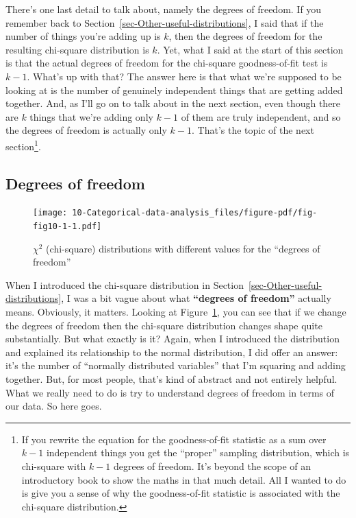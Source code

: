 \documentclass[
  a4paper,
]{book}
\begin{document}
There's one last detail to talk about, namely the degrees of freedom. If
you remember back to Section~\ref{sec-Other-useful-distributions}, I
said that if the number of things you're adding up is \(k\), then the
degrees of freedom for the resulting chi-square distribution is \(k\).
Yet, what I said at the start of this section is that the actual degrees
of freedom for the chi-square goodness-of-fit test is \(k - 1\). What's
up with that? The answer here is that what we're supposed to be looking
at is the number of genuinely independent things that are getting added
together. And, as I'll go on to talk about in the next section, even
though there are \(k\) things that we're adding only \(k - 1\) of them
are truly independent, and so the degrees of freedom is actually only
\(k - 1\). That's the topic of the next section\footnote{If you rewrite
  the equation for the goodness-of-fit statistic as a sum over \(k - 1\)
  independent things you get the ``proper'' sampling distribution, which
  is chi-square with \(k - 1\) degrees of freedom. It's beyond the scope
  of an introductory book to show the maths in that much detail. All I
  wanted to do is give you a sense of why the goodness-of-fit statistic
  is associated with the chi-square distribution.}.

\hypertarget{degrees-of-freedom}{%
\subsection{Degrees of freedom}\label{degrees-of-freedom}}

\begin{figure}

\texttt{[image: 10-Categorical-data-analysis\_files/figure-pdf/fig-fig10-1-1.pdf]} \hfill{}

\caption{\label{fig-fig10-1}\(\chi^2\) (chi-square) distributions with
different values for the ``degrees of freedom''}

\end{figure}

When I introduced the chi-square distribution in
Section~\ref{sec-Other-useful-distributions}, I was a bit vague about
what \textbf{``degrees of freedom''} actually means. Obviously, it
matters. Looking at Figure~\ref{fig-fig10-1}, you can see that if we
change the degrees of freedom then the chi-square distribution changes
shape quite substantially. But what exactly is it? Again, when I
introduced the distribution and explained its relationship to the normal
distribution, I did offer an answer: it's the number of ``normally
distributed variables'' that I'm squaring and adding together. But, for
most people, that's kind of abstract and not entirely helpful. What we
really need to do is try to understand degrees of freedom in terms of
our data. So here goes.
\end{document}

